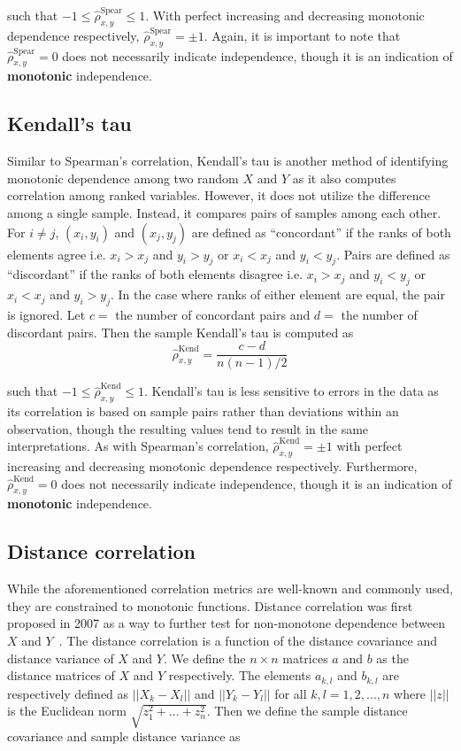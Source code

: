 \noindent such that $-1 \leq \hat{\rho}_{x,y}^{\text{Spear}} \leq 1$. With 
perfect increasing and decreasing monotonic dependence respectively,
$\hat{\rho}_{x,y}^{\text{Spear}} = \pm1$. Again, it is important to note that 
$\hat{\rho}_{x,y}^{\text{Spear}}=0$ does not necessarily indicate 
independence, though it is an indication of \textbf{monotonic} independence.

\subsection{Kendall's tau}

Similar to Spearman's correlation, Kendall's tau is another method of
identifying monotonic dependence among two random $X$ and $Y$ as it also
computes correlation among ranked variables. However, it does not utilize the
difference among a single sample. Instead, it compares pairs of samples among
each other. For $i\not=j$, $(x_i,y_i)$ and $(x_j,y_j)$ are defined as
``concordant'' if the ranks of both elements agree i.e. $x_i > x_j$ and $y_i >
y_j$ or $x_i < x_j$ and $y_i < y_j$. Pairs are defined as ``discordant'' if the
ranks of both elements disagree i.e. $x_i > x_j$ and $y_i < y_j$ or $x_i < x_j$
and $y_i > y_j$. In the case where ranks of either element are equal, the pair
is ignored. Let $c=$ the number of concordant pairs and $d=$ the number of
discordant pairs. Then the sample Kendall's tau is computed as 
$$\hat{\rho}_{x,y}^{\text{Kend}}=\frac{c-d}{n(n-1)/2}$$

\noindent such that $-1 \leq \hat{\rho}_{x,y}^{\text{Kend}} \leq 1$. 
Kendall's tau is less sensitive to errors in the data as its correlation is
based on sample pairs rather than deviations within an observation, though the
resulting values tend to result in the same interpretations. As with Spearman's
correlation, $\hat{\rho}_{x,y}^{\text{Kend}}=\pm1$ with perfect increasing 
and decreasing monotonic dependence respectively. Furthermore, 
$\hat{\rho}_{x,y}^{\text{Kend}}=0$ does not necessarily indicate
independence, though it is an indication of \textbf{monotonic} independence.

\subsection{Distance correlation}

While the aforementioned correlation metrics are well-known and commonly used, 
they are constrained to monotonic functions. Distance correlation was first 
proposed in 2007 as a way to further test for non-monotone dependence between 
$X$ and $Y$~\cite{szekely2007}. The distance correlation is a function of the 
distance covariance and distance variance of $X$ and $Y$. We define the 
$n\times n$ matrices $a$ and $b$ as the distance matrices of $X$ and $Y$ 
respectively. The elements $a_{k,l}$ and $b_{k,l}$ are respectively defined as 
$||X_k-X_l||$ and $||Y_k-Y_l||$ for all $k,l=1,2,...,n$ where $||z||$ is the 
Euclidean norm $\sqrt{z_1^2+...+z_n^2}$. Then we define the sample distance 
covariance and sample distance variance as 

